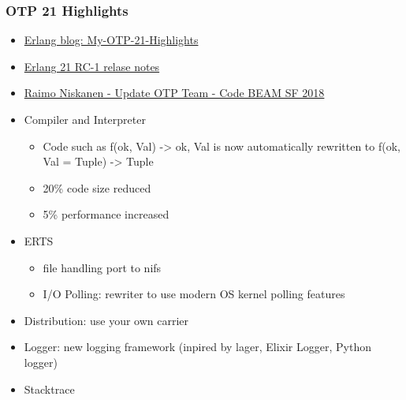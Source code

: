 \documentclass{beamer}
\begin{document}
  \begin{frame}
    \frametitle{OTP 21 Highlights}

    \begin{block}{}
      \begin{itemize}
        \item \href{http://blog.erlang.org/My-OTP-21-Highlights}{Erlang blog: My-OTP-21-Highlights}
        \item \href{https://github.com/erlang/otp/releases/tag/OTP-21.0-rc1}{Erlang 21 RC-1 relase notes}
        \item \href{https://www.youtube.com/watch?v=hHhm0bfdj-4}{Raimo Niskanen - Update OTP Team - Code BEAM SF 2018}   
      \end{itemize}
    \end{block}
     
    \pause
    
    \begin{itemize}[<+->]
    \item Compiler and Interpreter
      \begin{itemize}
      \item Code such as f({ok, Val}) -> {ok, Val} is now automatically rewritten to f({ok, Val} = Tuple) -> Tuple
      \item 20\% code size reduced
      \item 5\% performance increased
      \end{itemize}    

    \item ERTS
      \begin{itemize}
      \item file handling port to nifs
      \item I/O Polling: rewriter to use modern OS kernel polling features
      \end{itemize}

    \item Distribution: use your own carrier
    \item Logger: new logging framework (inpired by lager, Elixir Logger, Python logger)
    \item Stacktrace
    \end{itemize}
    
  \end{frame}
  
\end{document}
